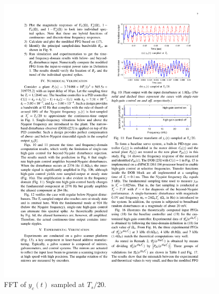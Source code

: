 \documentclass [11pt, proquest] {uwthesis}[2020/02/24]
\begin{document}
\begin{figure}[!ht]
\begin{centering}
\includegraphics[width=13cm]{Spectral-analysis/FIG11.pdf}
\par\end{centering}
\caption{\label{fig:disturbance-at-1.8}FFT of $y_{c}(t)$
sampled at $T_{s}/20$.}
\end{figure}
\end{document}
